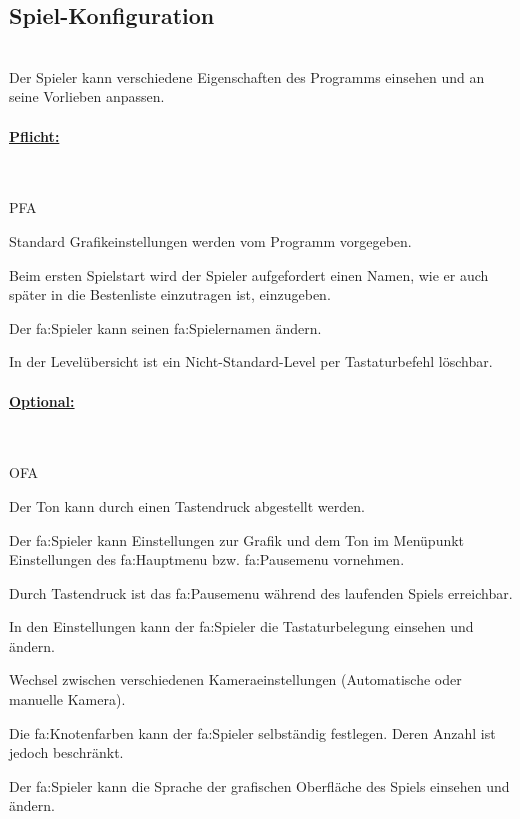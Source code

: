 %
%


\subsection{Spiel-Konfiguration}

%
%
\renewcommand{\K}{}
%
%

~\\
Der Spieler kann verschiedene Eigenschaften des Programms einsehen und an seine Vorlieben anpassen.\\

%
%
\paragraph*{\underline{Pflicht:}}~\\

\begin{ids}{\gls{PFA\K}}

 	\id[ 10] Standard Grafikeinstellungen werden vom Programm vorgegeben.
 	
 	\id[ 15] Beim ersten Spielstart wird der Spieler aufgefordert einen Namen, wie er auch später in die Bestenliste einzutragen ist, einzugeben.
 		
 	\id[ 20] Der \gls{fa:Spieler} kann seinen \gls{fa:Spielername}n ändern.
 	 	
 	\id[ 27] In der Levelübersicht ist ein Nicht-Standard-Level per Tastaturbefehl löschbar.
	
\end{ids}


%
%
\paragraph*{\underline{Optional:}}~\\


\begin{ids}{\gls{OFA\K}}

 	\id[ 25] Der Ton kann durch einen Tastendruck abgestellt werden.

	\id[ 30] Der \gls{fa:Spieler} kann Einstellungen zur Grafik und dem Ton im Menüpunkt Einstellungen des \gls{fa:Hauptmenu} bzw. \gls{fa:Pausemenu} vornehmen.
	
	\id[ 40] Durch Tastendruck ist das \gls{fa:Pausemenu} während des laufenden Spiels erreichbar.	
	
	\id[ 50] In den Einstellungen kann der \gls{fa:Spieler} die Tastaturbelegung einsehen und  ändern.
	
 	\id[60] Wechsel zwischen verschiedenen Kameraeinstellungen (Automatische oder manuelle Kamera).
 	
 	\id[ 70] Die \gls{fa:Knoten}farben kann der \gls{fa:Spieler} selbständig festlegen. Deren Anzahl ist jedoch beschränkt.
 	
 	\id[ 80] Der \gls{fa:Spieler} kann die Sprache der grafischen Oberfläche des Spiels einsehen und ändern.
 	
\end{ids}



